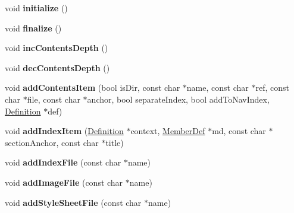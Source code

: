 \begin{DoxyCompactItemize}
\item 
\hypertarget{class_qhp_a25a40b6614565f755233080a384c35f1}{void {\bfseries initialize} ()}\label{class_qhp_a25a40b6614565f755233080a384c35f1}

\item 
\hypertarget{class_qhp_a32d626626eee0bc4ade146973f6abb1c}{void {\bfseries finalize} ()}\label{class_qhp_a32d626626eee0bc4ade146973f6abb1c}

\item 
\hypertarget{class_qhp_a96772b5eeae8044b3308f63fb040c253}{void {\bfseries inc\-Contents\-Depth} ()}\label{class_qhp_a96772b5eeae8044b3308f63fb040c253}

\item 
\hypertarget{class_qhp_a3a6a2629dd91105d0048f0d0a9f7f983}{void {\bfseries dec\-Contents\-Depth} ()}\label{class_qhp_a3a6a2629dd91105d0048f0d0a9f7f983}

\item 
\hypertarget{class_qhp_a2037325cd2bf36b4a134b87dbb107a94}{void {\bfseries add\-Contents\-Item} (bool is\-Dir, const char $\ast$name, const char $\ast$ref, const char $\ast$file, const char $\ast$anchor, bool separate\-Index, bool add\-To\-Nav\-Index, \hyperlink{class_definition}{Definition} $\ast$def)}\label{class_qhp_a2037325cd2bf36b4a134b87dbb107a94}

\item 
\hypertarget{class_qhp_acae96bcfb2681e31a0e64854dd3809fe}{void {\bfseries add\-Index\-Item} (\hyperlink{class_definition}{Definition} $\ast$context, \hyperlink{class_member_def}{Member\-Def} $\ast$md, const char $\ast$section\-Anchor, const char $\ast$title)}\label{class_qhp_acae96bcfb2681e31a0e64854dd3809fe}

\item 
\hypertarget{class_qhp_a8e569c4ea40f30de2accf0a87b7d8d30}{void {\bfseries add\-Index\-File} (const char $\ast$name)}\label{class_qhp_a8e569c4ea40f30de2accf0a87b7d8d30}

\item 
\hypertarget{class_qhp_aefbd88dbfc0690476b7430a480dcec6c}{void {\bfseries add\-Image\-File} (const char $\ast$name)}\label{class_qhp_aefbd88dbfc0690476b7430a480dcec6c}

\item 
\hypertarget{class_qhp_a6c501a6ffa3459c75470e5c532073ff5}{void {\bfseries add\-Style\-Sheet\-File} (const char $\ast$name)}\label{class_qhp_a6c501a6ffa3459c75470e5c532073ff5}

\end{DoxyCompactItemize}
